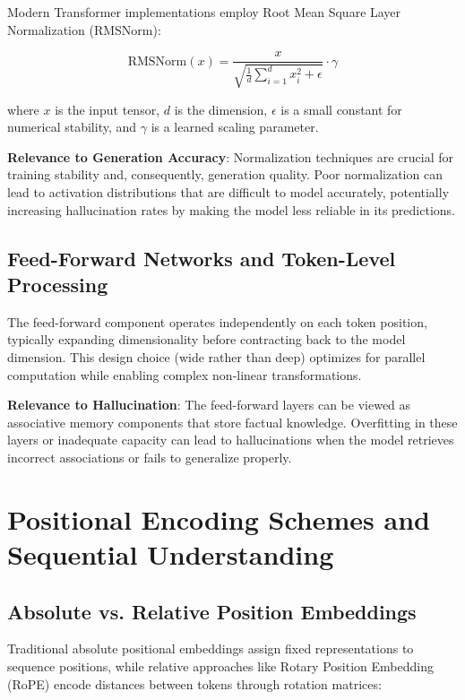 Modern Transformer implementations employ Root Mean Square Layer Normalization (RMSNorm):

\begin{equation}
\text{RMSNorm}(x) = \frac{x}{\sqrt{\frac{1}{d}\sum_{i=1}^d x_i^2 + \epsilon}} \cdot \gamma
\end{equation}

where $x$ is the input tensor, $d$ is the dimension, $\epsilon$ is a small constant for numerical stability, and $\gamma$ is a learned scaling parameter.

\textbf{Relevance to Generation Accuracy}: Normalization techniques are crucial for training stability and, consequently, generation quality. Poor normalization can lead to activation distributions that are difficult to model accurately, potentially increasing hallucination rates by making the model less reliable in its predictions.

\subsection{Feed-Forward Networks and Token-Level Processing}

The feed-forward component operates independently on each token position, typically expanding dimensionality before contracting back to the model dimension. This design choice (wide rather than deep) optimizes for parallel computation while enabling complex non-linear transformations.

\textbf{Relevance to Hallucination}: The feed-forward layers can be viewed as associative memory components that store factual knowledge. Overfitting in these layers or inadequate capacity can lead to hallucinations when the model retrieves incorrect associations or fails to generalize properly.

\section{Positional Encoding Schemes and Sequential Understanding}

\subsection{Absolute vs. Relative Position Embeddings}

Traditional absolute positional embeddings assign fixed representations to sequence positions, while relative approaches like Rotary Position Embedding (RoPE) encode distances between tokens through rotation matrices:

